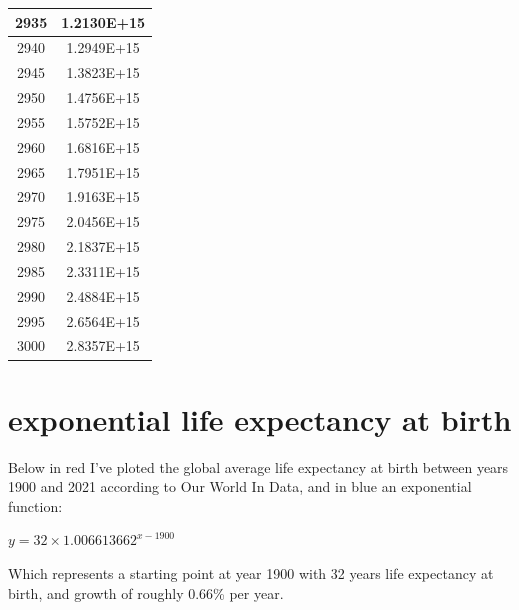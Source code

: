 \documentclass[a4paper]{article}
\begin{document}
\begin{tabular}{|c|c|}
		\hline
		2935 & 1.2130E+15 \\
		\hline
		2940 & 1.2949E+15 \\
		\hline
		2945 & 1.3823E+15 \\
		\hline
		2950 & 1.4756E+15 \\
		\hline
		2955 & 1.5752E+15 \\
		\hline
		2960 & 1.6816E+15 \\
		\hline
		2965 & 1.7951E+15 \\
		\hline
		2970 & 1.9163E+15 \\
		\hline
		2975 & 2.0456E+15 \\
		\hline
		2980 & 2.1837E+15 \\
		\hline
		2985 & 2.3311E+15 \\
		\hline
		2990 & 2.4884E+15 \\
		\hline
		2995 & 2.6564E+15 \\
		\hline
		3000 & 2.8357E+15 \\
		\hline
	\end{tabular}
	
	\normalsize
	
	\pagebreak
	
	\section{exponential life expectancy at birth}
	
	Below in red I've ploted the global average life expectancy at birth between years 1900 and 2021 according to Our World In Data, and in blue an exponential function:
	
	\begin{center}
		{\large $ y = 32 \times 1.006613662^{x-1900} $}
	\end{center}
	
	Which represents a starting point at year 1900 with 32 years life expectancy at birth, and growth of roughly 0.66\% per year.
	
	\medskip
	
\end{document}
